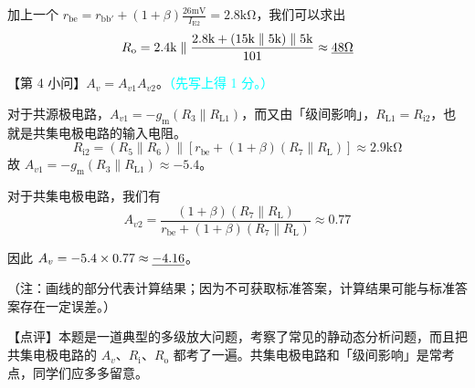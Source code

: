 \documentclass[UTF8]{ctexart}
\newcommand\Emph[1]{\colorbox{red!20!}{\textcolor{red!80!black}{#1}}}
\newcommand\xb[1]{_\mathrm{#1}}
\begin{document}
加上一个 $r\xb{be} = r\xb{bb'}+(1+\beta)\frac{\mathrm{26mV}}{I\xb{E2}} = \mathrm{2.8k\Omega}$，我们可以求出
\begin{equation}
    R\xb{o} = \mathrm{2.4k \parallel \dfrac{2.8k + (15k\parallel 5k)\parallel 5k}{101} \approx \uline{48\Omega}}
\end{equation}

\noindent 【第 4 小问】$A_v = A_{v1} A_{v2}$。\textcolor{cyan}{（先写上得 1 分。）}

对于共源极电路，$A_{v1} = -g\xb{m}(R_3\parallel R\xb{L1})$，而又由「级间影响」，\Emph{$R\xb{L1} = R\xb{i2}$}，也就是共集电极电路的输入电阻。
\begin{equation}
    R\xb{i2} = (R_5\parallel R_6) \parallel [r\xb{be} + (1+\beta)(R_7\parallel R\xb{L})] \approx \mathrm{2.9k\Omega}
\end{equation}
故 $A_{v1} = -g\xb{m}(R_3\parallel R\xb{L1}) \approx -5.4$。

对于共集电极电路，我们有
\begin{equation}
    A_{v2} = \dfrac{(1+\beta)(R_7\parallel R\xb{L})}{r\xb{be} + (1+\beta)(R_7\parallel R\xb{L})} \approx 0.77
\end{equation}

因此 $A_v = -5.4\times 0.77 \approx \uline{-4.16}$。

\textcolor{cyan!80!black}{（注：画线的部分代表计算结果；因为不可获取标准答案，计算结果可能与标准答案存在一定误差。）}

\textcolor{cyan!80!black}{【点评】本题是一道典型的多级放大问题，考察了常见的静动态分析问题，而且把共集电极电路的 $A_v$、$R\xb{i}$、$R\xb{o}$ 都考了一遍。共集电极电路和「级间影响」是常考点，同学们应多多留意。}
\end{document}

